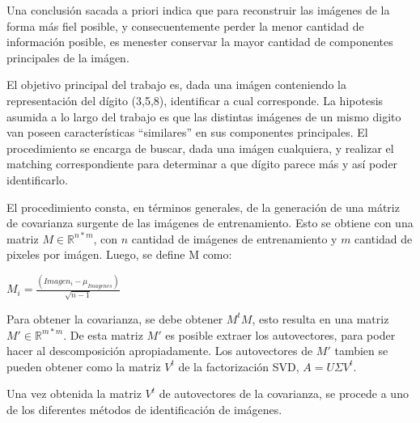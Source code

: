 Una conclusi\'on sacada a priori indica que para reconstruir las im\'agenes de la forma m\'as fiel posible,
y consecuentemente perder la menor cantidad de informaci\'on posible, es menester conservar la mayor cantidad
de componentes principales de la im\'agen.

El objetivo principal del trabajo es, dada una im\'agen conteniendo la representaci\'on del d\'igito (3,5,8),
identificar a cual corresponde. La hipotesis asumida a lo largo del trabajo es que las distintas im\'agenes
de un mismo digito van poseen caracter\'isticas ``similares'' en sus componentes principales.
El procedimiento se encarga de buscar, dada una im\'agen cualquiera, y realizar el matching correspondiente
para determinar a que d\'igito parece m\'as y as\'i poder identificarlo.

El procedimiento consta, en t\'erminos generales, de la generaci\'on de una m\'atriz de covarianza surgente
de las im\'agenes de entrenamiento. Esto se obtiene con una matriz $M \in \mathbb{R}^{n * m}$, con $n$ cantidad
de im\'agenes de entrenamiento y $m$ cantidad de pixeles por im\'agen. Luego, se define M como:

$M_i = \frac{(Imagen_i - \mu_{Imagenes})}{\sqrt{n-1}}$

Para obtener la covarianza, se debe obtener $M^t M$, esto resulta en una matriz $M' \in \mathbb{R}^{m * m}$.
De esta matriz $M'$ es posible extraer los autovectores, para poder hacer al descomposici\'on apropiadamente.
Los autovectores de $M'$ tambien se pueden obtener como la matriz $V^t$ de la factorizaci\'on SVD, $A=U\Sigma V^t$.

Una vez obtenida la matriz $V^t$ de autovectores de la covarianza, se procede a uno de los diferentes m\'etodos de
identificaci\'on de im\'agenes.

